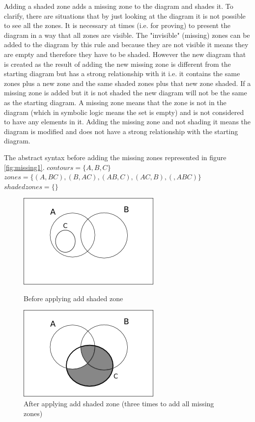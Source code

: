 \documentclass[10pt, a4paper, titlepage]{article}
\begin{document}
Adding a shaded zone adds a missing zone to the diagram and shades it. To clarify, there are situations that by just looking at the diagram it is not possible to see all the zones. It is necessary at times (i.e. for proving) to present the diagram in a way that all zones are visible. The "invisible" (missing) zones can be added to the diagram by this rule and because they are not visible it means they are empty and therefore they have to be shaded. However the new diagram that is created as the result of adding the new missing zone is different from the starting diagram but has a strong relationship with it  i.e. it contains the same zones plus a new zone and the same shaded zones plus that new zone shaded. If a missing zone is added but it is not shaded the new diagram will not be the same as the starting diagram. A missing zone means that the zone is not in the diagram (which in symbolic logic means the set is empty) and is not considered to have any elements in it. Adding the missing zone and not shading it means the diagram is modified and does not have a strong relationship with the starting diagram. \newline

The abstract syntax before adding the missing zones represented in figure \ref{fig:missing1}.\newline
$contours =  \lbrace A, B, C \rbrace $ \newline
$zones = \lbrace (A , BC) , (B , AC), (AB , C) , (AC, B), (  , ABC) \rbrace  $ \newline 
$shaded zones = \lbrace \rbrace  $ \newline

\begin{figure}[h]
\begin{minipage}[h]{0.5\linewidth}
\centering
\includegraphics[scale=0.5]{images/d4sh1.png}
\caption{Before applying add shaded zone}
\label{fig:missing1}
\end{minipage}
\hspace{0.5cm}
\begin{minipage}[h]{0.5\linewidth}
\centering
\includegraphics[scale=0.5]{images/d4sh2.png}
\caption{After applying add shaded zone (three times to add all missing zones)}
\label{fig:missing2}
\end{minipage}
\end{figure}
\end{document}
